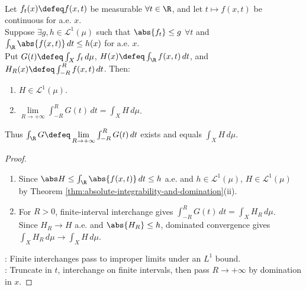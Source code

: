 \begin{corollary} \label{cor:improper-riemann-parameter-integral-interchange} \\
Let $f_t(x)\defeq f(x,t)$ be measurable $\forall t\in\R$, and let $t\mapsto f(x,t)$ be continuous for a.e. $x$.\\
Suppose $\exists g,h\in\mathscr{L}^1(\mu)$ such that $\abs{f_t}\leq g$ $\forall t$ and $\int_\R\abs{f(x,t)}\,dt\leq h(x)$ for a.e. $x$.\\
Put $G(t)\defeq\int_Xf_t\,d\mu$, $H(x)\defeq\int_\R f(x,t)\,dt$, and $H_R(x)\defeq\int_{-R}^{R}f(x,t)\,dt$. Then:
\begin{enumerate}[label=(\roman*)]
\setlength{\itemsep}{0pt}
\item $H\in\mathscr{L}^1(\mu)$.
\item $\lim\limits_{R\to+\infty}\int_{-R}^{R}G(t)\,dt=\int_XH\,d\mu$.
\end{enumerate}
Thus $\int_\R G\defeq\lim\limits_{R\to+\infty}\int_{-R}^{R}G(t)\,dt$ exists and equals $\int_XH\,d\mu$.
\begin{proof}
\begin{enumerate}[label=(\roman*)]
\setlength{\itemsep}{0pt}
\item Since $\abs H\leq\int_\R\abs{f(x,t)}\,dt\leq h$ a.e. and $h\in\mathscr{L}^1(\mu)$, $H\in\mathscr{L}^1(\mu)$ by Theorem \ref{thm:absolute-integrability-and-domination}(ii).
\item For $R>0$, finite-interval interchange gives $\int_{-R}^{R}G(t)\,dt=\int_XH_R\,d\mu$.\\
Since $H_R\to H$ a.e. and $\abs{H_R}\leq h$, dominated convergence gives $\int_XH_R\,d\mu\to\int_XH\,d\mu$.
\end{enumerate}
: Finite interchanges pass to improper limits under an $L^1$ bound.\\
: Truncate in $t$, interchange on finite intervals, then pass $R\to+\infty$ by domination in $x$.
\end{proof}
\end{corollary}
